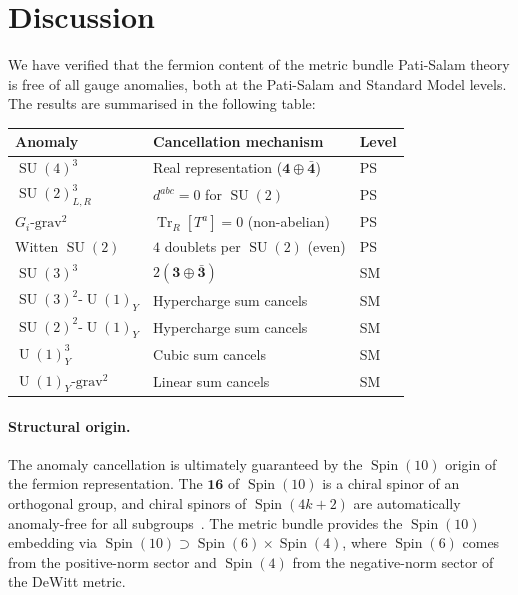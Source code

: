 \documentclass[12pt,a4paper]{article}
\theoremstyle{definition}
\newcommand{\Tr}{\operatorname{Tr}}
\newcommand{\SU}{\operatorname{SU}}
\newcommand{\U}{\operatorname{U}}
\newcommand{\Spin}{\operatorname{Spin}}
\begin{document}
\section{Discussion}
\label{sec:discussion}

We have verified that the fermion content of the metric bundle Pati-Salam theory is free of all gauge anomalies, both at the Pati-Salam and Standard Model levels.
The results are summarised in the following table:

\begin{center}
\renewcommand{\arraystretch}{1.3}
\begin{tabular}{lll}
\toprule
\textbf{Anomaly} & \textbf{Cancellation mechanism} & \textbf{Level} \\
\midrule
$\SU(4)^3$ & Real representation ($\mathbf{4} \oplus \bar{\mathbf{4}}$) & PS \\
$\SU(2)_{L,R}^3$ & $d^{abc} = 0$ for $\SU(2)$ & PS \\
$G_i\text{-grav}^2$ & $\Tr_R[T^a] = 0$ (non-abelian) & PS \\
Witten $\SU(2)$ & $4$ doublets per $\SU(2)$ (even) & PS \\
$\SU(3)^3$ & $2(\mathbf{3} \oplus \bar{\mathbf{3}})$ & SM \\
$\SU(3)^2\text{-}\U(1)_Y$ & Hypercharge sum cancels & SM \\
$\SU(2)^2\text{-}\U(1)_Y$ & Hypercharge sum cancels & SM \\
$\U(1)_Y^3$ & Cubic sum cancels & SM \\
$\U(1)_Y\text{-grav}^2$ & Linear sum cancels & SM \\
\bottomrule
\end{tabular}
\end{center}

\paragraph{Structural origin.}
The anomaly cancellation is ultimately guaranteed by the $\Spin(10)$ origin of the fermion representation.
The $\mathbf{16}$ of $\Spin(10)$ is a chiral spinor of an orthogonal group, and chiral spinors of $\Spin(4k+2)$ are automatically anomaly-free for all subgroups~\cite{BaezHuerta2010}.
The metric bundle provides the $\Spin(10)$ embedding via $\Spin(10) \supset \Spin(6) \times \Spin(4)$, where $\Spin(6)$ comes from the positive-norm sector and $\Spin(4)$ from the negative-norm sector of the DeWitt metric.
\end{document}
